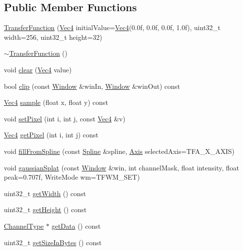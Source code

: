 \subsection*{\-Public \-Member \-Functions}
\begin{DoxyCompactItemize}
\item 
\hyperlink{class_verdi_1_1_transfer_function_a17bbf3cfaa9dcadfab523f14dcd58e7a}{\-Transfer\-Function} (\hyperlink{class_verdi_1_1_vec4}{\-Vec4} initial\-Value=\hyperlink{class_verdi_1_1_vec4}{\-Vec4}(0.\-0f, 0.\-0f, 0.\-0f, 1.\-0f), uint32\-\_\-t width=256, uint32\-\_\-t height=32)
\item 
\hyperlink{class_verdi_1_1_transfer_function_a7efc65a27624c5b9d00b85db3c57578d}{$\sim$\-Transfer\-Function} ()
\item 
void \hyperlink{class_verdi_1_1_transfer_function_ab6aeb29ae01bc6688f2aba5fd447673e}{clear} (\hyperlink{class_verdi_1_1_vec4}{\-Vec4} value)
\item 
bool \hyperlink{class_verdi_1_1_transfer_function_a8a606afbc03a6144a0a15f439f6bc65b}{clip} (const \hyperlink{struct_verdi_1_1_transfer_function_1_1_window}{\-Window} \&win\-In, \hyperlink{struct_verdi_1_1_transfer_function_1_1_window}{\-Window} \&win\-Out) const 
\item 
\hyperlink{class_verdi_1_1_vec4}{\-Vec4} \hyperlink{class_verdi_1_1_transfer_function_aaae7e0e9f733ab8ed3114447b565fc7f}{sample} (float x, float y) const 
\item 
void \hyperlink{class_verdi_1_1_transfer_function_a54be61acfa1029df1479d526759177e1}{set\-Pixel} (int i, int j, const \hyperlink{class_verdi_1_1_vec4}{\-Vec4} \&v)
\item 
\hyperlink{class_verdi_1_1_vec4}{\-Vec4} \hyperlink{class_verdi_1_1_transfer_function_a97f8e158c077564cb1924d1e604f3532}{get\-Pixel} (int i, int j) const 
\item 
void \hyperlink{class_verdi_1_1_transfer_function_a11db544256ac1c5bac79e0b8204cae4e}{fill\-From\-Spline} (const \hyperlink{class_verdi_1_1_spline}{\-Spline} \&spline, \hyperlink{class_verdi_1_1_transfer_function_a1b35c3ddc3f16d44146168cdad8cdd6a}{\-Axis} selected\-Axis=\-T\-F\-A\-\_\-\-X\-\_\-\-A\-X\-I\-S)
\item 
void \hyperlink{class_verdi_1_1_transfer_function_aff50d962da1aa841b12a93fb48dd0459}{gaussian\-Splat} (const \hyperlink{struct_verdi_1_1_transfer_function_1_1_window}{\-Window} \&win, int channel\-Mask, float intensity, float peak=0.\-707f, Write\-Mode wm=\-T\-F\-W\-M\-\_\-\-S\-E\-T)
\item 
uint32\-\_\-t \hyperlink{class_verdi_1_1_transfer_function_a798fa2967a73da00c42d02e05be92865}{get\-Width} () const 
\item 
uint32\-\_\-t \hyperlink{class_verdi_1_1_transfer_function_a9733e302b419c60ef8d3f30b071e4a61}{get\-Height} () const 
\item 
\hyperlink{class_verdi_1_1_transfer_function_aebdbb5a13f273ee6d47d1a4dde6d6aa6}{\-Channel\-Type} $\ast$ \hyperlink{class_verdi_1_1_transfer_function_adfec747a20426aecccf56cc7aebd0a8c}{get\-Data} () const 
\item 
uint32\-\_\-t \hyperlink{class_verdi_1_1_transfer_function_aafe449537f5300b8a5ab242dc16f5b7f}{get\-Size\-In\-Bytes} () const 
\end{DoxyCompactItemize}
